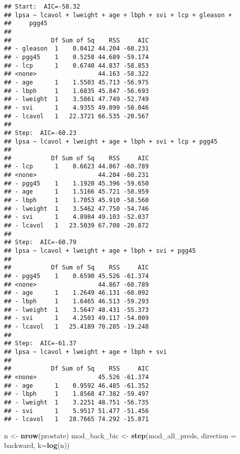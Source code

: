\documentclass[
]{article}
\newenvironment{Shaded}{\begin{snugshade}}{\end{snugshade}}
\newcommand{\AttributeTok}[1]{\textcolor[rgb]{0.13,0.29,0.53}{#1}}
\newcommand{\FunctionTok}[1]{\textcolor[rgb]{0.13,0.29,0.53}{\textbf{#1}}}
\newcommand{\NormalTok}[1]{#1}
\newcommand{\OtherTok}[1]{\textcolor[rgb]{0.56,0.35,0.01}{#1}}
\newcommand{\StringTok}[1]{\textcolor[rgb]{0.31,0.60,0.02}{#1}}
\begin{document}
\begin{enumerate}
\begin{verbatim}
## Start:  AIC=-58.32
## lpsa ~ lcavol + lweight + age + lbph + svi + lcp + gleason + 
##     pgg45
## 
##           Df Sum of Sq    RSS     AIC
## - gleason  1    0.0412 44.204 -60.231
## - pgg45    1    0.5258 44.689 -59.174
## - lcp      1    0.6740 44.837 -58.853
## <none>                 44.163 -58.322
## - age      1    1.5503 45.713 -56.975
## - lbph     1    1.6835 45.847 -56.693
## - lweight  1    3.5861 47.749 -52.749
## - svi      1    4.9355 49.099 -50.046
## - lcavol   1   22.3721 66.535 -20.567
## 
## Step:  AIC=-60.23
## lpsa ~ lcavol + lweight + age + lbph + svi + lcp + pgg45
## 
##           Df Sum of Sq    RSS     AIC
## - lcp      1    0.6623 44.867 -60.789
## <none>                 44.204 -60.231
## - pgg45    1    1.1920 45.396 -59.650
## - age      1    1.5166 45.721 -58.959
## - lbph     1    1.7053 45.910 -58.560
## - lweight  1    3.5462 47.750 -54.746
## - svi      1    4.8984 49.103 -52.037
## - lcavol   1   23.5039 67.708 -20.872
## 
## Step:  AIC=-60.79
## lpsa ~ lcavol + lweight + age + lbph + svi + pgg45
## 
##           Df Sum of Sq    RSS     AIC
## - pgg45    1    0.6590 45.526 -61.374
## <none>                 44.867 -60.789
## - age      1    1.2649 46.131 -60.092
## - lbph     1    1.6465 46.513 -59.293
## - lweight  1    3.5647 48.431 -55.373
## - svi      1    4.2503 49.117 -54.009
## - lcavol   1   25.4189 70.285 -19.248
## 
## Step:  AIC=-61.37
## lpsa ~ lcavol + lweight + age + lbph + svi
## 
##           Df Sum of Sq    RSS     AIC
## <none>                 45.526 -61.374
## - age      1    0.9592 46.485 -61.352
## - lbph     1    1.8568 47.382 -59.497
## - lweight  1    3.2251 48.751 -56.735
## - svi      1    5.9517 51.477 -51.456
## - lcavol   1   28.7665 74.292 -15.871
\end{verbatim}

\begin{Shaded}
\begin{Highlighting}[]
\NormalTok{n }\OtherTok{\textless{}{-}} \FunctionTok{nrow}\NormalTok{(prostate)}
\NormalTok{mod\_back\_bic }\OtherTok{\textless{}{-}} \FunctionTok{step}\NormalTok{(mod\_all\_preds, }\AttributeTok{direction =} \StringTok{\textquotesingle{}backward\textquotesingle{}}\NormalTok{, }\AttributeTok{k=}\FunctionTok{log}\NormalTok{(n))}
\end{Highlighting}
\end{Shaded}


\end{enumerate}
\end{document}
